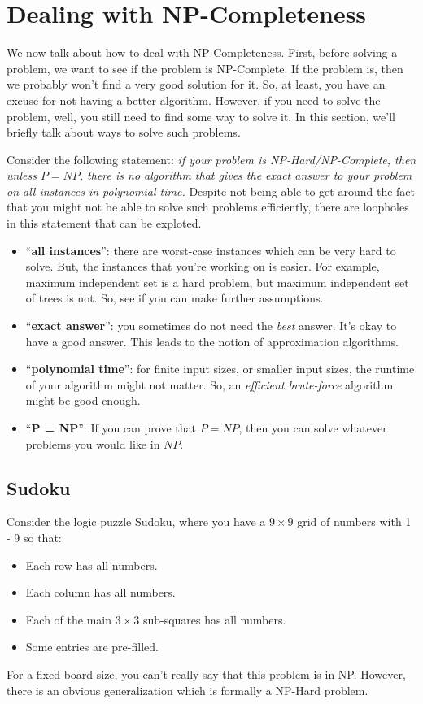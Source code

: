 \documentclass[letterpaper]{article}
\begin{document}
\newpage 
\section{Dealing with NP-Completeness}
We now talk about how to deal with NP-Completeness. First, before solving a problem, we want to see if the problem is NP-Complete. If the problem is, then we probably won't find a very good solution for it. So, at least, you have an excuse for not having a better algorithm. However, if you need to solve the problem, well, you still need to find some way to solve it. In this section, we'll briefly talk about ways to solve such problems. 

\bigskip 

Consider the following statement: \emph{if your problem is NP-Hard/NP-Complete, then unless $P = NP$, there is no algorithm that gives the exact answer to your problem on all instances in polynomial time.} Despite not being able to get around the fact that you might not be able to solve such problems efficiently, there are loopholes in this statement that can be exploted.
\begin{itemize}
    \item ``\textbf{all instances}'': there are worst-case instances which can be very hard to solve. But, the instances that you're working on is easier. For example, maximum independent set is a hard problem, but maximum independent set of trees is not. So, see if you can make further assumptions. 
    \item ``\textbf{exact answer}'': you sometimes do not need the \emph{best} answer. It's okay to have a good answer. This leads to the notion of approximation algorithms. 
    \item ``\textbf{polynomial time}'': for finite input sizes, or smaller input sizes, the runtime of your algorithm might not matter. So, an \emph{efficient brute-force} algorithm might be good enough. 
    \item ``\textbf{P = NP}'': If you can prove that $P = NP$, then you can solve whatever problems you would like in $NP$. 
\end{itemize}

\subsection{Sudoku}
Consider the logic puzzle Sudoku, where you have a $9 \times 9$ grid of numbers with 1 - 9 so that:
\begin{itemize}
    \item Each row has all numbers. 
    \item Each column has all numbers. 
    \item Each of the main $3 \times 3$ sub-squares has all numbers. 
    \item Some entries are pre-filled. 
\end{itemize}
For a fixed board size, you can't really say that this problem is in NP. However, there is an obvious generalization which is formally a NP-Hard problem. 
\end{document}
